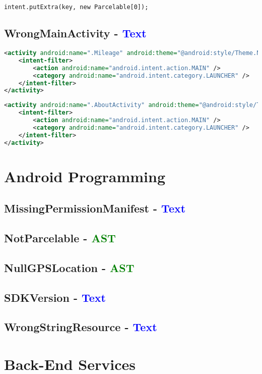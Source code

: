 \begin{lstlisting}[language=XML]
intent.putExtra(key, new Parcelable[0]);
\end{lstlisting}
\subsection{WrongMainActivity - \textcolor{blue}{Text}}
\begin{lstlisting}[language=XML]
<activity android:name=".Mileage" android:theme="@android:style/Theme.NoTitleBar">
	<intent-filter>
		<action android:name="android.intent.action.MAIN" />
		<category android:name="android.intent.category.LAUNCHER" />
	</intent-filter>
</activity> 
\end{lstlisting}

\begin{lstlisting}[language=XML]
<activity android:name=".AboutActivity" android:theme="@android:style/Theme.NoTitleBar">
	<intent-filter>
		<action android:name="android.intent.action.MAIN" />
		<category android:name="android.intent.category.LAUNCHER" />
	</intent-filter>
</activity>
\end{lstlisting}

\section{Android Programming}
\subsection{MissingPermissionManifest - \textcolor{blue}{Text}}
\subsection{NotParcelable - \textcolor{green}{AST}}
\subsection{NullGPSLocation - \textcolor{green}{AST}}
\subsection{SDKVersion - \textcolor{blue}{Text}}
\subsection{WrongStringResource - \textcolor{blue}{Text}}

\section{Back-End Services}
